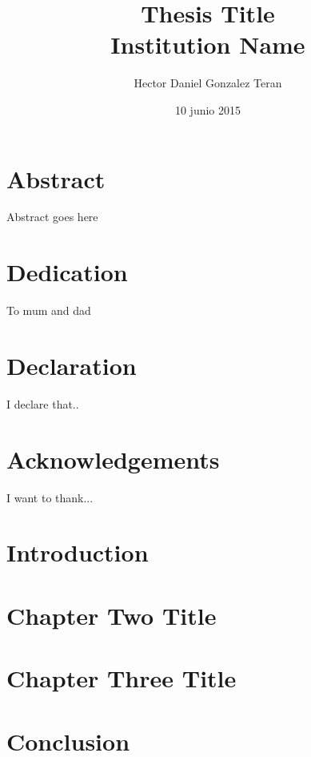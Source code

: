 \documentclass[a4paper,10pt]{report}
\title{
	{Thesis Title}\\
	{\large Institution Name}\\
}
\author{Hector Daniel Gonzalez Teran}
\date{10 junio 2015}
\begin{document}
\maketitle


\chapter*{Abstract}
Abstract goes here

\chapter*{Dedication}
To mum and dad

\chapter*{Declaration}
I declare that..

\chapter*{Acknowledgements}
I want to thank...

\tableofcontents

\chapter{Introduction}


\chapter{Chapter Two Title}


\chapter{Chapter Three Title}


\chapter{Conclusion}



\nocite{*}


\end{document}
